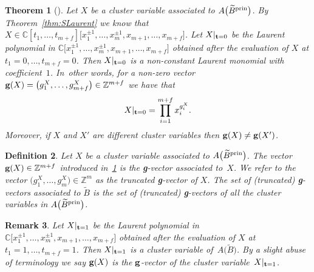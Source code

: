 \documentclass[10pt,a4paper]{amsart}
\newcommand{\thlabel}[1]{\label{#1}}
\newcommand{\thref}[1]{\ref{#1}}
\newtheorem{Theorem}{Theorem}[section]
\newtheorem{Definition}[Theorem]{Definition}
\newtheorem{Remark}[Theorem]{Remark}}
\numberwithin{equation}{section}
\begin{document}
\begin{Theorem}[{\cite[Theorem~1.7]{DWZ}}]
\thlabel{thm:g-vecs}
Let $X$ be a cluster variable associated to $A\big(\widetilde{B}^{\rm{prin}}\big)$.
By Theo\-rem~{\rm \ref{thm:SLaurent}} we know that $X\in \mathbb C [t_1,\dots ,t_{m+f}]\big[x_1^{\pm 1}, \dots , x_m^{\pm 1}, x_{m+1}, \dots , x_{m+f}\big]$.
Let $X|_{{\bf t}=0}$ be the Laurent polynomial in $\mathbb C \big[x_1^{\pm 1}, \dots , x_m^{\pm 1},x_{m+1}, \dots , x_{m+f}\big]$ obtained after the evaluation of $X$ at $t_1=0 ,\dots , t_{m+f}=0$. Then $X|_{{\bf t} = 0}$ is a non-constant Laurent monomial with coefficient~$1$. In~other words, for a non-zero vector ${\bf g}(X)=\big(g_1^X,\dots, g_{m+f}^X\big)\in \mathbb Z^{m+f}$ we have that
\begin{displaymath}
X|_{{\bf t}=0}=\prod_{i=1}^{m+f} x_i^{g^X_i}.
\end{displaymath}
Moreover, if $X$ and $X'$ are different cluster variables then ${\bf g }(X)\neq {\bf g}(X')$.
\end{Theorem}

\begin{Definition}\thlabel{def:g-vectors}
Let $X$ be a cluster variable associated to $A\big(\widetilde{B}^{\rm{prin}}\big)$. The vector ${\bf g}(X)\in \mathbb{Z}^{m+f}$ introduced in~\thref{thm:g-vecs} is the {\bf g}-{\it vector} associated to~$X$.
We refer to the vector $\big(g_1^X,\dots , g_m^X\big)\in \mathbb{Z}^m$ as the {\it truncated} {\bf g}-{\it vector} of $X$. The set of (truncated) {\bf g}-vectors associated to $\widetilde{B}$ is the set of (truncated) {\bf g}-vectors of all the cluster variables in $A\big(\widetilde{B}^{\rm{prin}}\big)$.
\end{Definition}

\begin{Remark}
Let $X|_{{\bf t}=1}$ be the Laurent polynomial in $\mathbb C \big[x_1^{\pm 1}, \dots , x_m^{\pm 1},x_{m+1}, \dots , x_{m+f}\big]$ obtai\-ned after the evaluation of $X$ at $t_1=1 ,\dots , t_{m+f}=1$. Then $X|_{{\bf t}=1}$ is a cluster variable of~$A\big(\widetilde{B}\big)$. By a slight abuse of terminology we say ${\bf g}(X)$ is the ${\bf g}$-vector of the cluster variable~$X|_{{\bf t}=1}$.
\end{Remark}
\end{document}

